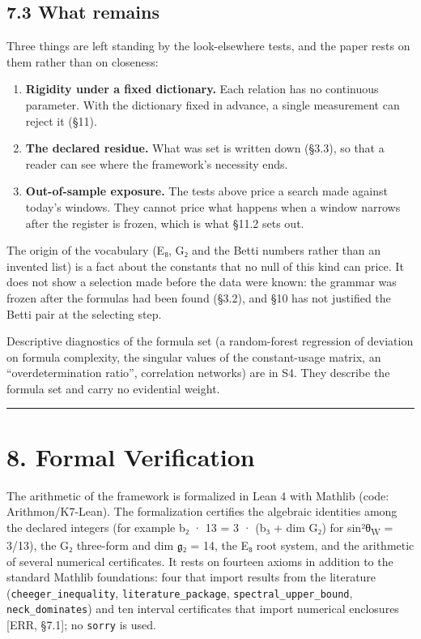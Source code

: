 \documentclass[11pt,a4paper]{article}
\begin{document}
\subsection{7.3 What remains}\label{what-remains}

Three things are left standing by the look-elsewhere tests, and the paper rests on them rather than on closeness:

\begin{enumerate}
\def\labelenumi{\arabic{enumi}.}
\tightlist
\item
  \textbf{Rigidity under a fixed dictionary.} Each relation has no continuous parameter. With the dictionary fixed in advance, a single measurement can reject it (§11).
\item
  \textbf{The declared residue.} What was set is written down (§3.3), so that a reader can see where the framework's necessity ends.
\item
  \textbf{Out-of-sample exposure.} The tests above price a search made against today's windows. They cannot price what happens when a window narrows after the register is frozen, which is what §11.2 sets out.
\end{enumerate}

The origin of the vocabulary (E₈, G₂ and the Betti numbers rather than an invented list) is a fact about the constants that no null of this kind can price. It does not show a selection made before the data were known: the grammar was frozen after the formulas had been found (§3.2), and §10 has not justified the Betti pair at the selecting step.

Descriptive diagnostics of the formula set (a random-forest regression of deviation on formula complexity, the singular values of the constant-usage matrix, an ``overdetermination ratio'', correlation networks) are in S4. They describe the formula set and carry no evidential weight.

\begin{center}\rule{\linewidth}{0.5pt}\end{center}

\section{8. Formal Verification}\label{formal-verification}

The arithmetic of the framework is formalized in Lean 4 \cite{28} with Mathlib \cite{29} (code: Arithmon/K7-Lean). The formalization certifies the algebraic identities among the declared integers (for example b₂ · 13 = 3 · (b₃ + dim G₂) for sin²θ\textsubscript{W} = 3/13), the G₂ three-form and dim \ensuremath{\mathfrak{g}}₂ = 14, the E₈ root system, and the arithmetic of several numerical certificates. It rests on fourteen axioms in addition to the standard Mathlib foundations: four that import results from the literature (\texttt{cheeger\_\allowbreak{}inequality}, \texttt{literature\_\allowbreak{}package}, \texttt{spectral\_\allowbreak{}upper\_\allowbreak{}bound}, \texttt{neck\_\allowbreak{}dominates}) and ten interval certificates that import numerical enclosures {[}ERR, §7.1{]}; no \texttt{sorry} is used.
\end{document}

